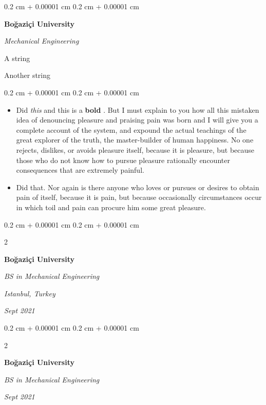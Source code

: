 \documentclass[10pt, letterpaper]{article}
\newenvironment{summary}{
    \begin{description}[
        topsep=0.10 cm,
        parsep=0.10 cm,
        partopsep=0pt,
        itemsep=0pt,
        leftmargin=0.4 cm + 10pt
    ]
}{
    \end{description}
} %
\newenvironment{highlights}{
    \begin{itemize}[
        topsep=0.10 cm,
        parsep=0.10 cm,
        partopsep=0pt,
        itemsep=0pt,
        leftmargin=0.4 cm + 10pt
    ]
}{
    \end{itemize}
} %
\newenvironment{onecolentry}{
    \begin{adjustwidth}{
        0.2 cm + 0.00001 cm
    }{
        0.2 cm + 0.00001 cm
    }
}{
    \end{adjustwidth}
} %
\newenvironment{twocolentry}[2][]{
    \onecolentry
    \def\secondColumn{#2}
    \setcolumnwidth{\fill, 4.5 cm}
    \begin{paracol}{2}
}{
    \switchcolumn \raggedleft \secondColumn
    \end{paracol}
    \endonecolentry
} %
\let\hrefWithoutArrow\href
\renewcommand{\href}[2]{\hrefWithoutArrow{#1}{\ifthenelse{\equal{#2}{}}{ }{#2 }\raisebox{.15ex}{\footnotesize \faExternalLink*}}}
\begin{document}
        \begin{onecolentry}
            \textbf{Boğaziçi University}

            \textit{Mechanical Engineering}
        \end{onecolentry}
            \begin{summary}
                \item A string
                \item Another string
            \end{summary}
        \vspace{0.10 cm}
        \begin{onecolentry}
            \begin{highlights}
                \item Did \textit{this} and this is a \textbf{bold} \href{https://example.com}{link}. But I must explain to you how all this mistaken idea of denouncing pleasure and praising pain was born and I will give you a complete account of the system, and expound the actual teachings of the great explorer of the truth, the master-builder of human happiness. No one rejects, dislikes, or avoids pleasure itself, because it is pleasure, but because those who do not know how to pursue pleasure rationally encounter consequences that are extremely painful.
                \item Did that. Nor again is there anyone who loves or pursues or desires to obtain pain of itself, because it is pain, but because occasionally circumstances occur in which toil and pain can procure him some great pleasure.
            \end{highlights}
        \end{onecolentry}


        \vspace{0.2 cm}

        \begin{twocolentry}{
        \textit{Istanbul, Turkey}    
            
        \textit{Sept 2021}}
            \textbf{Boğaziçi University}

            \textit{BS in Mechanical Engineering}
        \end{twocolentry}


        \vspace{0.2 cm}

        \begin{twocolentry}{
            
            
        \textit{Sept 2021}}
            \textbf{Boğaziçi University}

            \textit{BS in Mechanical Engineering}
        \end{twocolentry}
\end{document}
